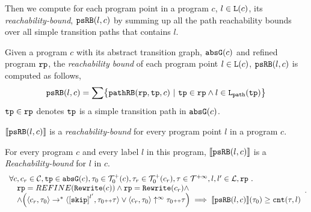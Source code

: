 Then we compute for each program point in a program $c$, $l \in \mathtt{L}(c)$,
its \emph{reachability-bound}, $\mathtt{psRB}(l, c)$ by summing up all the path reachability bounds over all simple transition paths that contains $l$.
%
\begin{defn}
\label{def:point_psrb}
Given a program $c$ with its {abstract transition graph}, $\mathtt{abs}{\mathtt{G}}(c)$ and refined program $\mathtt{rp}$,
the \emph{reachability bound} of each program point $l \in \mathtt{L}(c)$, $\mathtt{psRB}(l, c)$  is computed as follows,
\[ 
  \psRB(l, c) = 
  \sum
  \left\{ \inoutB(\rprog, \tpath, c) ~\vert~ \tpath \in \rprog \land 
  l \in \pathl(\tpath) \right\}
\]
$\mathtt{tp} \in \mathtt{rp}$ denotes $\mathtt{tp}$ is a simple transition path in $\mathtt{abs}{\mathtt{G}}(c)$.
\end{defn}
$\llbracket \mathtt{psRB}(l, c) \rrbracket$ is a \emph{reachability-bound} for every program point $l$ in a program $c$.
\begin{thm}[Soundness]
\label{thm:pathsensitive_rb_soundness}
For every program ${c}$ and every label $l$ in this program,
$\llbracket \mathtt{psRB}(l, c) \rrbracket$ is a \emph{Reachability-bound} for $l$ in $c$.
%
{\small
\[
  \begin{array}{l}
    \forall c, c_r \in \cdom, \tpath \in \absG(c), \trace_0 \in \ftdom_0(c),  \trace_r \in \ftdom_0(c_r), \trace \in \tdom, l, l' \in \ldom, \rprog \st 
    \\ \quad
    \rprog = REFINE(\algrewrite(c))
    \land 
    \rprog = \algrewrite(c_r)
    \land
    \\ \quad
    \land
    \Big(
    \config{c_r, \trace_0} \rightarrow^* \config{\clabel{\eskip}^{l'}, \trace_0 \tracecat \trace}
    \lor \config{c_r, \trace_0} \uparrow^{\infty} \trace_0 \tracecat \trace 
    \Big)
    \implies \econfig{\psRB(l, c)}(\trace_0) \geq \counter(\trace, l)
  \end{array}.
\]
}
\end{thm}